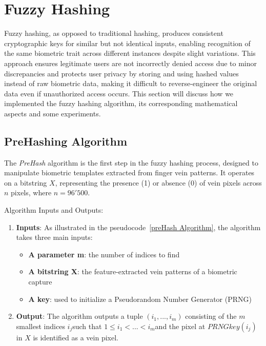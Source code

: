 


\section{Fuzzy Hashing}
\label{sec:Fuzzy Hashing}
Fuzzy hashing, as opposed to traditional hashing, produces consistent cryptographic keys for similar but not identical inputs, enabling recognition of the same biometric trait across different instances despite slight variations. This approach ensures legitimate users are not incorrectly denied access due to minor discrepancies and protects user privacy by storing and using hashed values instead of raw biometric data, making it difficult to reverse-engineer the original data even if unauthorized access occurs. 
This section will discuss how we implemented the fuzzy hashing algorithm, its corresponding mathematical aspects and some experiments.

\subsection{PreHashing Algorithm}

The \textit{PreHash} algorithm is the first step in the fuzzy hashing process, designed to manipulate biometric templates extracted from finger vein patterns. It operates on a bitstring \(X\), representing the presence (1) or absence (0) of vein pixels across \(n\) pixels, where \(n=96'500\).

Algorithm Inputs and Outputs:
\begin{enumerate}
    \item \textbf{Inputs}: As illustrated in the pseudocode~\ref{preHash Algorithm}, the algorithm takes three main inputs:
    \begin{itemize}
        \item \textbf{A parameter m}: the number of indices to find
        \item \textbf{A bitstring X}: the feature-extracted vein patterns of a biometric capture
        \item \textbf{A key}: used to initialize a Pseudorandom Number Generator (PRNG)
    \end{itemize}
    \item \textbf{Output}: The algorithm outputs a tuple \((i_1,...,i_m)\) consisting of the \(m\) smallest indices \(i_j\)​ such that \(1 \leq i_1<...<i_m\)​ and the pixel at \(PRNGkey(i_j)\) in \(X\) is identified as a vein pixel. 
\end{enumerate}

